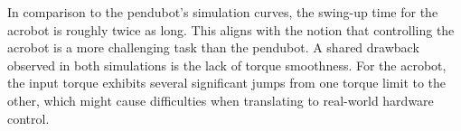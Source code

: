 In comparison to the pendubot's simulation curves, the swing-up time for the acrobot is roughly twice as long. This aligns with the notion that controlling the acrobot is a more challenging task than the pendubot. A shared drawback observed in both simulations is the lack of torque smoothness. For the acrobot, the input torque exhibits several significant jumps from one torque limit to the other, which might cause difficulties when translating to real-world hardware control.

\cleardoublepage
